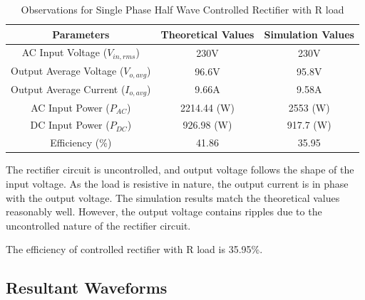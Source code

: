 \begin{table}[h]
    \renewcommand{\arraystretch}{1.3}
    \label{table_observation_single-phase-half-wave-controlled-rectifier-with-R-load}
    \centering
    \begin{tabular}{|c|c|c|}
        \hline
        Parameters                              & Theoretical Values & Simulation Values \\
        \hline
        \hline
        AC Input Voltage ($ V_{in,rms} $)       & 230V               & 230V             \\
        \hline
        Output Average Voltage ($ V_{o,avg} $)  & 96.6V              & 95.8V            \\
        \hline
        Output Average Current ($ I_{o,avg}  $) & 9.66A              & 9.58A            \\
        \hline
        AC Input Power ($ P_{AC}  $)            & 2214.44 (W)        & 2553 (W)         \\
        \hline
        DC Input Power ($ P_{DC}  $)            & 926.98 (W)         & 917.7 (W)        \\
        \hline
        Efficiency (\%)                         & 41.86              & 35.95             \\
        \hline
    \end{tabular}
    \caption{Observations for Single Phase Half Wave Controlled Rectifier with R load}

\end{table}


The rectifier circuit is uncontrolled, and output voltage follows the shape of the input voltage. As the load is resistive in nature, the output current is in phase with the output voltage. The simulation results match the theoretical values reasonably well. However, the output voltage contains ripples due to the uncontrolled nature of the rectifier circuit.

The efficiency of controlled rectifier with R load is 35.95\%.

\pagebreak


\subsection{Resultant Waveforms}

